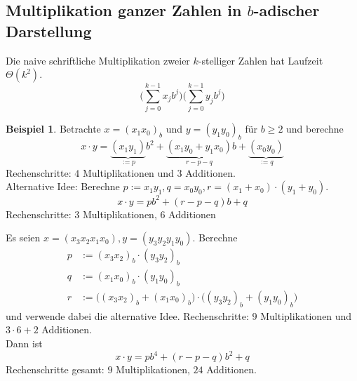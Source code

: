 \documentclass[a4paper,12pt]{article}
\theoremstyle{definition}
\newtheorem*{example}{Beispiel}
\begin{document}
	\subsection{Multiplikation ganzer Zahlen in $b$-adischer Darstellung}
	Die naive schriftliche Multiplikation zweier $k$-stelliger Zahlen hat Laufzeit $\Theta(k^2)$.
	\[
		\bigg(\sum_{j=0}^{k-1}x_jb^j\bigg)\bigg(\sum_{j=0}^{k-1}y_jb^j\bigg)
	\]
	\begin{example}
		Betrachte $x = (x_1x_0)_b$ und $y = (y_1y_0)_b$ für $b \geq 2$ und berechne
		\[
			x \cdot y = \underbrace{(x_1y_1)}_{:=p}b^2 + \underbrace{(x_1y_0 + y_1x_0)}_{r-p-q}b + \underbrace{(x_0y_0)}_{:=q}
		\]
		Rechenschritte: $4$ Multiplikationen und $3$ Additionen.\\[2ex]
		Alternative Idee: Berechne $p := x_1y_1, q = x_0y_0, r = (x_1 + x_0) \cdot (y_1 + y_0)$.
		\[
			x \cdot y = pb^2 + (r-p-q)b + q
		\]
		Rechenschritte: $3$ Multiplikationen, $6$ Additionen
		
		Es seien $x = (x_3x_2x_1x_0), y = (y_3y_2y_1y_0)$. Berechne
		\begin{align*}
			p &:= (x_3x_2)_b \cdot (y_3y_2)_b\\
			q &:= (x_1x_0)_b \cdot (y_1y_0)_b\\
			r &:= \big((x_3x_2)_b + (x_1x_0)_b\big) \cdot \big((y_3y_2)_b + (y_1y_0)_b\big)
		\end{align*}
		und verwende dabei die alternative Idee. Rechenschritte: $9$ Multiplikationen und $3\cdot 6 + 2$ Additionen.\\[2ex]
		Dann ist 
		\[
			x\cdot y = pb^4 + (r-p-q)b^2 + q
		\]
		Rechenschritte gesamt: $9$ Multiplikationen, $24$ Additionen.
	\end{example}
\end{document}
